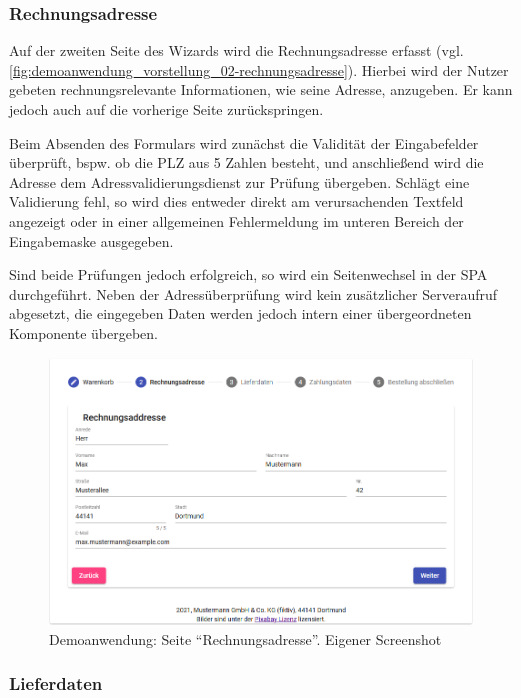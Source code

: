 \subsubsection{Rechnungsadresse}

Auf der zweiten Seite des Wizards wird die Rechnungsadresse erfasst (vgl. \autoref{fig:demoanwendung_vorstellung_02-rechnungsadresse}). Hierbei wird der Nutzer gebeten rechnungsrelevante Informationen, wie seine Adresse, anzugeben. Er kann jedoch auch auf die vorherige Seite zurückspringen.

Beim Absenden des Formulars wird zunächst die Validität der Eingabefelder überprüft, bspw. ob die PLZ aus 5 Zahlen besteht, und anschließend wird die Adresse dem Adressvalidierungsdienst zur Prüfung übergeben. Schlägt eine Validierung fehl, so wird dies entweder direkt am verursachenden Textfeld angezeigt oder in einer allgemeinen Fehlermeldung im unteren Bereich der Eingabemaske ausgegeben.

Sind beide Prüfungen jedoch erfolgreich, so wird ein Seitenwechsel in der SPA durchgeführt. Neben der Adressüberprüfung wird kein zusätzlicher Serveraufruf abgesetzt, die eingegeben Daten werden jedoch intern einer übergeordneten Komponente übergeben.

\begin{figure}[H]
	\centering
	\includegraphics[width=1.00\linewidth]{img/04_erstellung-poc/demoanwendung_vorstellung_02-rechnungsadresse.png}
	\caption{Demoanwendung: Seite \enquote{Rechnungsadresse}. Eigener Screenshot}
	\label{fig:demoanwendung_vorstellung_02-rechnungsadresse}
\end{figure}

\newpage

\subsubsection{Lieferdaten}


